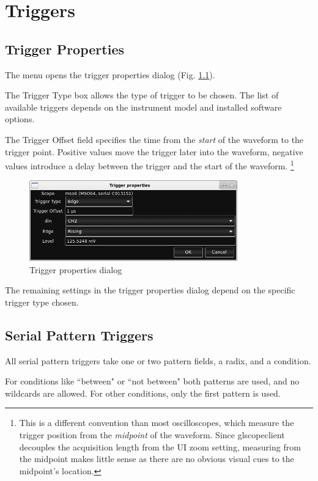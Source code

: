 \chapter{Triggers}

\section{Trigger Properties}

The  menu opens the trigger properties dialog (Fig. \ref{trigger-properties}).

The Trigger Type box allows the type of trigger to be chosen. The list of available triggers depends on the instrument
model and installed software options.

The Trigger Offset field specifies the time from the \emph{start} of the waveform to the trigger point. Positive values
move the trigger later into the waveform, negative values introduce a delay between the trigger and the start of the
waveform. \footnote{This is a different convention than most oscilloscopes, which measure the trigger position from the
\emph{midpoint} of the waveform. Since glscopeclient decouples the acquisition length from the UI zoom setting,
measuring from the midpoint makes little sense as there are no obvious visual cues to the midpoint's location.}

\begin{figure}[h]
\centering
\includegraphics[width=9cm]{images/trigger-properties.png}
\caption{Trigger properties dialog}
\label{trigger-properties}
\end{figure}

The remaining settings in the trigger properties dialog depend on the specific trigger type chosen.

\section{Serial Pattern Triggers}

All serial pattern triggers take one or two pattern fields, a radix, and a condition.

For conditions like ``between" or ``not between" both patterns are used, and no wildcards are allowed. For other
conditions, only the first pattern is used.


